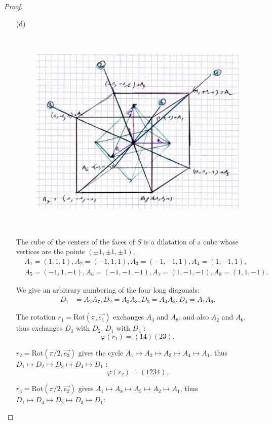\documentclass[11pt,a4paper]{article}
\begin{document}
\begin{proof}
\begin{enumerate}
\item[(d)]
\begin{figure}[htbp]
\begin{center}
\includegraphics [width=12cm, height=10cm]  {octaedre.png}
\end{center}
\end{figure}

The cube of the centers of the faces of $S$ is a dilatation of a cube whose vertices are the points $(\pm 1, \pm1,\pm1)$, 
\begin{align*}
&A_1 = (1,1,1),A_2=(-1,1,1),A_3=(-1,-1,1),A_4=(1,-1,1),\\
&A_5=(-1,1,-1),A_6=(-1,-1,-1),A_7=(1,-1,-1),A_8=(1,1,-1).
\end{align*}

We give an arbitrary numbering of the four long diagonals:
\begin{align*}
D_1 &= A_2A_7, D_2=A_3A_8,
D_3=A_4A_5,D_4 =A_1A_6.
\end{align*}

The rotation $r_1 = \mathrm{Rot}(\pi, \overrightarrow{e_1})$ exchanges $A_4$ and $A_8$, and also $A_2$ and $A_6$,  thus exchanges $D_3$ with $D_2 $, $D_1$ with $D_4$ :
$$\varphi(r_1) = (1 4)(2 3).$$


$r_2 = \mathrm{Rot}(\pi/2, \overrightarrow{e_3})$ gives the cycle $A_1 \mapsto A_2\mapsto A_3 \mapsto A_4\mapsto A_1$, thus $D_1 \mapsto D_2 \mapsto D_3 \mapsto D_4 \mapsto D_1$ :
$$\varphi(r_2) = (1 2 3 4).$$


$r_3 = \mathrm{Rot}(\pi/2, \overrightarrow{e_2})$ gives $A_1 \mapsto A_8 \mapsto A_5 \mapsto A_2\mapsto A_1$, thus $D_1 \mapsto D_4 \mapsto D_2 \mapsto D_3 \mapsto D_1$:


\end{enumerate}
\end{proof}
\end{document}
